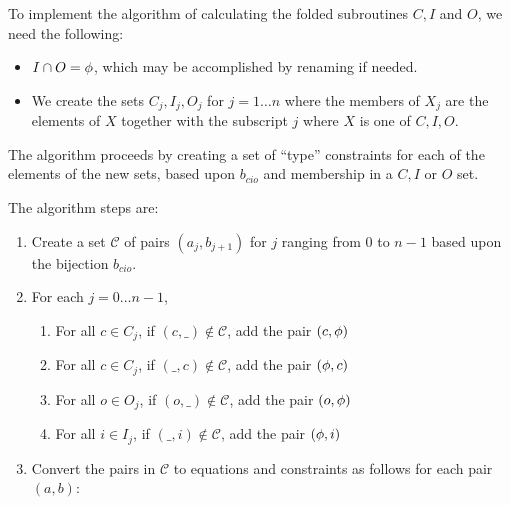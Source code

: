 To implement the algorithm of calculating the folded subroutines $C,I$ and
$O$, we need the following:
\begin{itemize}
  \item $I\cap O = \phi$, which may be accomplished by renaming if needed.
  \item We create the sets $C_j,I_j,O_j$ for $j=1\ldots n$ where the members
    of $X_j$ are the elements of $X$ together with the subscript $j$ where
    $X$ is one of $C,I,O$.
\end{itemize}

The algorithm proceeds by creating a set of ``type'' constraints for each of
the elements of the new sets, based upon $b_{cio}$ and membership in a $C,I$
or $O$ set.

The algorithm steps are:
\begin{enumerate}
  \item Create a set $\mathcal{C}$ of pairs $(a_j,b_{j+1})$ for $j$
  ranging from $0$ to $n-1$ based upon the bijection $b_{cio}$.
  \item For each $j=0\ldots n-1$,
  \begin{enumerate}
    \item For all $c\in C_j$, if $(c,\_)\notin\mathcal{C}$,
      add the pair $(c,\phi)$
    \item For all $c\in C_j$, if $(\_,c)\notin\mathcal{C}$,
      add the pair $(\phi,c)$
    \item For all $o\in O_j$, if $(o,\_)\notin\mathcal{C}$,
      add the pair $(o,\phi)$
    \item For all $i\in I_j$, if $(\_,i)\notin\mathcal{C}$,
      add the pair $(\phi,i)$
  \end{enumerate}
  \item Convert the pairs in $\mathcal{C}$ to equations and constraints as
    follows for each pair $(a,b)$:
\end{enumerate}
